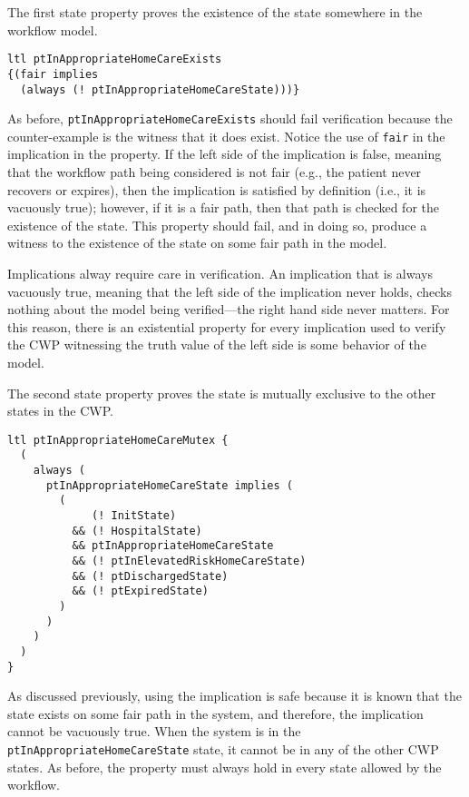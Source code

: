 The first state property proves the existence of the state somewhere in the workflow model.
%
{\small
\begin{lstlisting}[style=myPromela]
ltl ptInAppropriateHomeCareExists 
{(fair implies 
  (always (! ptInAppropriateHomeCareState)))}
\end{lstlisting}
}
%
\noindent As before, \texttt{ptInAppropriateHomeCareExists} should fail verification because the counter-example is the witness that it does exist. Notice the use of \texttt{fair} in the implication in the property. If the left side of the implication is false, meaning that the workflow path being considered is not fair (e.g., the patient never recovers or expires), then the implication is satisfied by definition (i.e., it is vacuously true); however, if it is a fair path, then that path is checked for the existence of the state. This property should fail, and in doing so, produce a witness to the existence of the state on some fair path in the model.

Implications alway require care in verification. An implication that is always vacuously true, meaning that the left side of the implication never holds, checks nothing about the model being verified---the right hand side never matters. For this reason, there is an existential property for every implication used to verify the CWP witnessing the truth value of the left side is some behavior of the model.

The second state property proves the state is mutually exclusive to the other states in the CWP.
%
{\small
\begin{lstlisting}[style=myPromela]
ltl ptInAppropriateHomeCareMutex {
  ( 
    always (
      ptInAppropriateHomeCareState implies (
        (
             (! InitState)
          && (! HospitalState)
          && ptInAppropriateHomeCareState
          && (! ptInElevatedRiskHomeCareState)
          && (! ptDischargedState)
          && (! ptExpiredState)
        )
      )
    )
  )
}
\end{lstlisting}
}
%
\noindent As discussed previously, using the implication is safe because it is known that the state exists on some fair path in the system, and therefore, the implication cannot be vacuously true. When the system is in the \texttt{ptInAppropriateHomeCareState} state, it cannot be in any of the other CWP states. As before, the property must always hold in every state allowed by the workflow.


